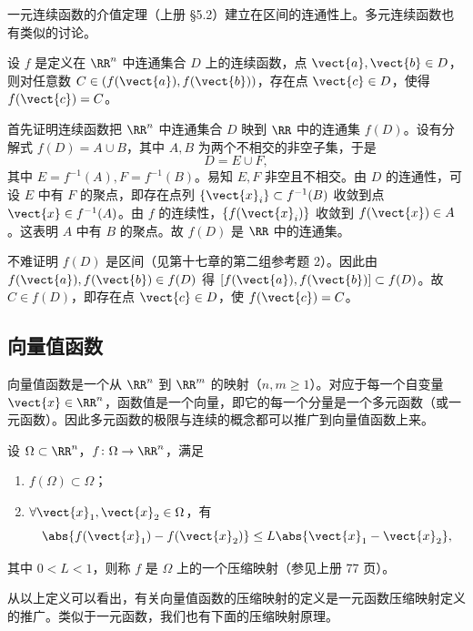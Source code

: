 一元连续函数的介值定理（上册 §5.2）建立在区间的连通性上。多元连续函数也有类似的讨论。

\begin{xproposition}[18.2.4]
设 $f$ 是定义在 $\RR^n$ 中连通集合 $D$ 上的连续函数，点 $\vect{a},\vect{b}\in D$，则对任意数 $C\in(f(\vect{a}),f(\vect{b}))$，存在点 $\vect{c}\in D$，使得 $f(\vect{c})=C$。
\end{xproposition}
\begin{xproof}
首先证明连续函数把 $\RR^n$ 中连通集合 $D$ 映到 $\RR$ 中的连通集 $f(D)$。设有分解式 $f(D)=A\cup B$，其中 $A,B$ 为两个不相交的非空子集，于是
\[
  D=E\cup F,
\]
其中 $E=f^{-1}(A),F=f^{-1}(B)$。易知 $E,F$ 非空且不相交。由 $D$ 的连通性，可设 $E$ 中有 $F$ 的聚点，即存在点列 $\{\vect{x}_i\}\subset f^{-1}(B)$ 收敛到点 $\vect{x}\in f^{-1}(A)$。由 $f$ 的连续性，$\{f(\vect{x}_i)\}$ 收敛到 $f(\vect{x})\in A$。这表明 $A$ 中有 $B$ 的聚点。故 $f(D)$ 是 $\RR$ 中的连通集。

不难证明 $f(D)$ 是区间（见第十七章的第二组参考题 2）。因此由 $f(\vect{a}),f(\vect{b})\in f(D)$ 得 $[f(\vect{a}),f(\vect{b})]\subset f(D)$。故 $C\in f(D)$，即存在点 $\vect{c}\in D$，使 $f(\vect{c})=C$。
\end{xproof}

\subsection{向量值函数}

向量值函数是一个从 $\RR^n$ 到 $\RR^m$ 的映射（$n,m\ge1$）。对应于每一个自变量 $\vect{x}\in\RR^n$，函数值是一个向量，即它的每一个分量是一个多元函数（或一元函数）。因此多元函数的极限与连续的概念都可以推广到向量值函数上来。

\begin{xdefinition}
设 $\Omega\subset\RR^n$，$f\colon\Omega\to\RR^n$，满足
\begin{enumerate}[label=(\arabic*)]
  \item $f(\Omega)\subset\Omega$；
  \item $\forall\vect{x}_1,\vect{x}_2\in\Omega$，有
  \[
    \abs{f(\vect{x}_1)-f(\vect{x}_2)}\le L\abs{\vect{x}_1-\vect{x}_2},
  \]
\end{enumerate}
其中 $0<L<1$，则称 $f$ 是 $\Omega$ 上的一个压缩映射（参见上册 77 页）。
\end{xdefinition}

从以上定义可以看出，有关向量值函数的压缩映射的定义是一元函数压缩映射定义的推广。类似于一元函数，我们也有下面的压缩映射原理。

